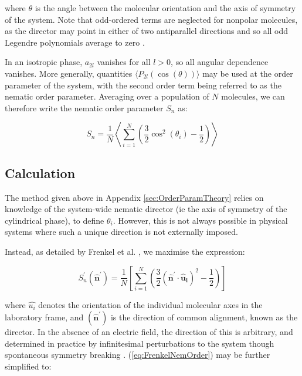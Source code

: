 \documentclass[11pt, a4paper]{article} %
\begin{document}
\begin{appendices}
where $\theta$ is the angle between the molecular orientation and the axis of symmetry of the system. Note that odd-ordered terms are neglected for nonpolar molecules, as the director may point in either of two antiparallel directions and so all odd Legendre polynomials average to zero \cite{Parsons1979}.

In an isotropic phase, $a_{2l}$ vanishes for all $l>0$, so all angular dependence vanishes. More generally,  quantities $\langle P_{2l}(\cos(\theta)) \rangle$ may be used at the order parameter of the system, with the second order term being referred to as the nematic order parameter. Averaging over a population of $N$ molecules, we can therefore write the nematic order parameter $S_{n}$ as:

\begin{equation}
S_{n} = \frac{1}{N} \left\langle \sum_{i=1}^{N} \left( \frac{3}{2} \cos^{2}(\theta_{i})-\frac{1}{2} \right) \right\rangle
\end{equation}

\subsection{Calculation}\label{sec:OrderParamCalc}
The method given above in Appendix \ref{sec:OrderParamTheory} relies on knowledge of the system-wide nematic director (ie the axis of symmetry of the cylindrical phase), to define $\theta_{i}$. However, this is not always possible in physical systems where such a unique direction is not externally imposed.

Instead, as detailed by Frenkel et al. \cite{Frenkel1985}, we maximise the expression:

\begin{equation} \label{eq:FrenkelNemOrder}
S^{\prime}_{n}(\boldsymbol{\hat{n}^{\prime}}) = \frac{1}{N} \left[ \sum_{i=1}^{N} \left( \frac{3}{2} (\boldsymbol{\hat{n}^{\prime}} \cdot \boldsymbol{\hat{u}_{i}})^{2}-\frac{1}{2} \right) \right]
\end{equation}

where $\hat{u_{i}}$ denotes the orientation of the individual molecular axes in the laboratory frame, and $(\boldsymbol{\hat{n}^{\prime}})$ is the direction of common alignment, known as the director. In the absence of an electric field, the direction of this is arbitrary, and determined in practice by infinitesimal perturbations to the system though spontaneous symmetry breaking \cite{Forster2018}. (\ref{eq:FrenkelNemOrder}) may be further simplified to:


\end{appendices}
\end{document}
